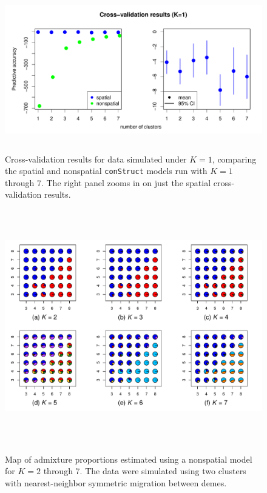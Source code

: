 \documentclass[12pt]{article}
\begin{document}
\begin{figure}
	\centering
		{\includegraphics[width=5in,height=2.5in]{figs/sims/simK1_std_xval.pdf}}
		\caption{
			Cross-validation results for data simulated under $K=1$,
			comparing the spatial and nonspatial \texttt{conStruct} models run with $K=1$ through 7.  
			The right panel zooms in on just the spatial cross-validation results.
		}\label{simK1_xval}
\end{figure}


\newpage
\begin{figure}
	\centering
		{\includegraphics[width=6in,height=4in]{figs/sims/simK2_nsp_pies.pdf}}
	\caption{
	Map of admixture proportions estimated using a nonspatial model for $K=2$ through 7.
	The data were simulated using two clusters with nearest-neighbor symmetric migration between demes.
    }\label{simK2_nsp_pies}
\end{figure}
\end{document}

